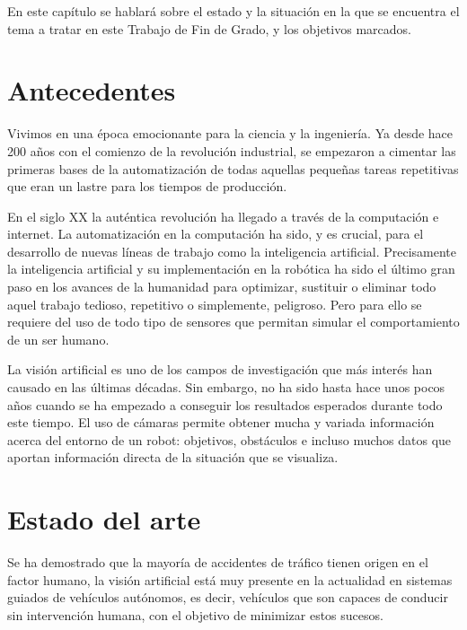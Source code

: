 

En este capítulo se hablará sobre el estado y la situación en la que se
encuentra el tema a tratar en este Trabajo de Fin de Grado, y los objetivos
marcados.


\section{Antecedentes}
\label{1:sec:1}

Vivimos en una época emocionante para la ciencia y la ingeniería. Ya desde hace
200 años con el comienzo de la revolución industrial, se empezaron a cimentar
las primeras bases de la automatización de todas aquellas pequeñas tareas
repetitivas que eran un lastre para los tiempos de producción.

En el siglo XX la auténtica revolución ha llegado a través de la computación e
internet. La automatización en la computación ha sido, y es crucial, para el
desarrollo de nuevas líneas de trabajo como la inteligencia artificial.
Precisamente la inteligencia artificial y su implementación en la robótica ha
sido el último gran paso en los avances de la humanidad para optimizar,
sustituir o eliminar todo aquel trabajo tedioso, repetitivo o simplemente,
peligroso. Pero para ello se requiere del uso de todo tipo de sensores que
permitan simular el comportamiento de un ser humano.

La visión artificial es uno de los campos de investigación que más interés han
causado en las últimas décadas. Sin embargo, no ha sido hasta hace unos pocos
años cuando se ha empezado a conseguir los resultados esperados durante todo
este tiempo. El uso de cámaras permite obtener mucha y variada información
acerca del entorno de un robot: objetivos, obstáculos e incluso muchos datos que
aportan información directa de la situación que se visualiza.


\section{Estado del arte}
\label{1:sec:2}
Se ha demostrado que la mayoría de accidentes de tráfico tienen origen en el
factor humano, la visión artificial está muy presente en la actualidad en
sistemas guiados de vehículos autónomos, es decir, vehículos que son capaces de conducir sin intervención humana, con el objetivo de minimizar estos sucesos.

